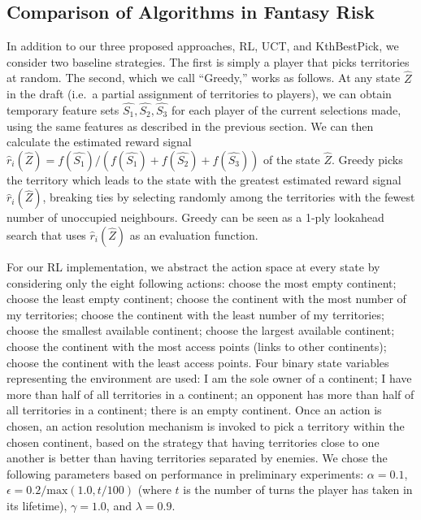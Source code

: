 \documentclass[letterpaper]{article}
\numberwithin{equation}{section}
\numberwithin{theorem}{section}
\numberwithin{lemma}{section}
\numberwithin{df}{section}
\begin{document}
\subsection{Comparison of Algorithms in Fantasy Risk}

In addition to our three proposed approaches, RL, UCT, and KthBestPick, we consider two baseline strategies.  The first is simply a player that picks territories at random.  The second, which we call ``Greedy,'' works as follows.  At any state $\hat{Z}$ in the draft (i.e.~a partial assignment of territories to players), we can obtain temporary feature sets $\hat{S_1}, \hat{S_2}, \hat{S_3}$ for each player of the current selections made, using the same features as described in the previous section.  We can then calculate the estimated reward signal $\hat{r}_i(\hat{Z}) = f(\hat{S_1}) / (f(\hat{S_1}) + f(\hat{S_2}) + f(\hat{S_3}))$ of the state $\hat{Z}$.  Greedy picks the territory which leads to the state with the greatest estimated reward signal $\hat{r}_i(\hat{Z})$, breaking ties by selecting randomly among the territories with the fewest number of unoccupied neighbours.  %
Greedy can be seen as a 1-ply lookahead search that uses $\hat{r}_i(\hat{Z})$ as an evaluation function.

For our RL implementation, we abstract the action space at every state by considering only the eight following actions: choose the most empty continent; choose the least empty continent; choose the continent with the most number of my territories; choose the continent with the least number of my territories; choose the smallest available continent; choose the largest available continent; choose the continent with the most access points (links to other continents); choose the continent with the least access points.  Four binary state variables representing the environment are used: I am the sole owner of a continent; I have more than half of all territories in a continent; an opponent has more than half of all territories in a continent; there is an empty continent.  Once an action is chosen, an action resolution mechanism is invoked to pick a territory within the chosen continent, based on the strategy that having territories close to one another is better than having territories separated by enemies.  We chose the following parameters based on performance in preliminary experiments: $\alpha = 0.1$, $\epsilon = 0.2 / \text{max}(1.0, t/100)$ (where $t$ is the number of turns the player has taken in its lifetime), $\gamma = 1.0$, and $\lambda = 0.9$.
\end{document}
